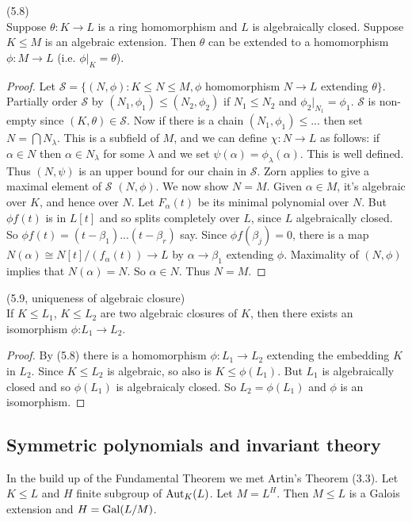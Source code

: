 \documentclass[a4paper]{article}
\begin{document}
\begin{thm} (5.8)\\
Suppose $\theta:K \to L$ is a ring homomorphism and $L$ is algebraically closed. Suppose $K \leq M$ is an algebraic extension. Then $\theta$ can be extended to a homomorphism $\phi:M \to L$ (i.e. $\phi|_K = \theta$).
\begin{proof}
Let $\mathcal{S} = \{(N,\phi):K \leq N \leq M, \phi$ homomorphism $N \to L$ extending $\theta\}$. Partially order $\mathcal{S}$ by $(N_1,\phi_1) \leq (N_2,\phi_2)$ if $N_1 \leq N_2$ and $\phi_2|_{N_1} = \phi_1$. $\mathcal{S}$ is non-empty since $(K,\theta) \in \mathcal{S}$. Now if there is a chain $(N_1,\phi_1) \leq ...$ then set $N = \bigcap N_\lambda$. This is a subfield of $M$, and we can define $\chi:N \to L$ as follows: if $\alpha \in N$ then $\alpha \in N_\lambda$ for some $\lambda$ and we set $\psi(\alpha) = \phi_\lambda(\alpha)$. This is well defined. Thus $(N,\psi)$ is an upper bound for our chain in $\mathcal{S}$. Zorn applies to give a maximal element of $\mathcal{S}$ $(N,\phi)$. We now show $N = M$. Given $\alpha \in M$, it's algebraic over $K$, and hence over $N$. Let $F_\alpha(t)$ be its minimal polynomial over $N$. But $\phi f(t)$ is in $L[t]$ and so splits completely over $L$, since $L$ algebraically closed. So $\phi f(t) = (t-\beta_1)...(t-\beta_r)$ say. Since $\phi f(\beta_j) = 0$, there is a map $N(\alpha) \cong N[t] / (f_\alpha(t)) \to L$ by $\alpha \to \beta_1$ extending $\phi$. Maximality of $(N,\phi)$ implies that $N(\alpha) = N$. So $\alpha \in N$. Thus $N=M$.
\end{proof}
\end{thm}

\begin{thm} (5.9, uniqueness of algebraic closure)\\
If $K \leq L_1$, $K \leq L_2$ are two algebraic closures of $K$, then there exists an isomorphism $\phi$:$L_1 \to L_2$.
\begin{proof}
By (5.8) there is a homomorphism $\phi:L_1 \to L_2$ extending the embedding $K$ in $L_2$. Since $K \leq L_2$ is algebraic, so also is $K \leq \phi(L_1)$. But $L_1$ is algebraically closed and so $\phi(L_1)$ is algebraicaly closed. So $L_2 = \phi(L_1)$ and $\phi$ is an isomorphism.
\end{proof}
\end{thm}

\subsection{Symmetric polynomials and invariant theory}
In the build up of the Fundamental Theorem we met Artin's Theorem (3.3). Let $K \leq L$ and $H$ finite subgroup of $\operatorname{Aut}_K(L)$. Let $M = L^H$. Then $M \leq L$ is a Galois extension and $H = \operatorname{Gal}(L/M)$.
\end{document}
